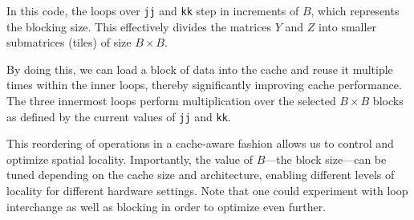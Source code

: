 \documentclass[12pt]{book}
\begin{document}
In this code, the loops over \texttt{jj} and \texttt{kk} step in increments of $B$, which represents the blocking size. This effectively divides the matrices $Y$ and $Z$ into smaller submatrices (tiles) of size $B \times B$. 

By doing this, we can load a block of data into the cache and reuse it multiple times within the inner loops, thereby significantly improving cache performance. The three innermost loops perform multiplication over the selected $B \times B$ blocks as defined by the current values of \texttt{jj} and \texttt{kk}. 

This reordering of operations in a cache-aware fashion allows us to control and optimize spatial locality. Importantly, the value of $B$—the block size—can be tuned depending on the cache size and architecture, enabling different levels of locality for different hardware settings. Note that one could experiment with loop interchange as well as blocking in order to optimize even further.
\end{document}
